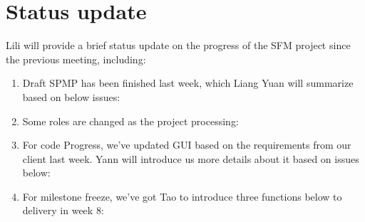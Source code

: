 \documentclass[11pt, a4paper]{article}
\begin{document}


\section{Status update}

Lili will provide a brief status update on the progress of the SFM project since the previous meeting, including:

\begin{enumerate}

\item Draft SPMP has been finished last week, which Liang Yuan will summarize based on below issues:
{}
\item Some roles are changed as the project processing:
\item For code Progress, we've updated GUI based on the requirements from our client last week. Yann will introduce us more details about it based on issues below:


\item For milestone freeze, we've got Tao to introduce three functions below to delivery in week 8:
 
\end{enumerate}
\end{document}
